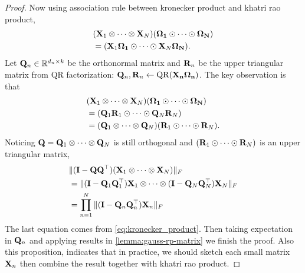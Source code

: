 \begin{proof}
Now using association rule between kronecker product and khatri rao product,   
\begin{equation}
\begin{aligned}
& (\mathbf{X}_1\otimes \cdots \otimes \mathbf{X}_N)(\mathbf{\Omega_1} \odot \cdots \odot \mathbf{\Omega_N})  \\
& = ( \mathbf{X}_1\mathbf{\Omega_1}\odot \cdots \odot  \mathbf{X}_N\mathbf{\Omega_N}). 
\end{aligned}
\end{equation}
 Let $\mathbf{Q}_n\in \mathbb{R}^{d_n\times k}$ be the orthonormal matrix and $\mathbf{R}_n$ be the upper triangular matrix from QR factorization: $\mathbf{Q}_n, \mathbf{R}_n \gets  \rm{QR}(\mathbf{X_n\Omega_n})$. The key observation is that 
\begin{equation}
\begin{aligned}
& (\mathbf{X}_1\otimes \cdots \otimes \mathbf{X}_N)(\mathbf{\Omega_1} \odot \cdots \odot \mathbf{\Omega_N})  \\
& = ( \mathbf{Q}_1\mathbf{R}_1 \odot \cdots \odot  \mathbf{Q}_N\mathbf{R}_N)\\
& = (\mathbf{Q}_1 \otimes \cdots \otimes \mathbf{Q}_N) (\mathbf{R}_1\odot \cdots \odot \mathbf{R}_N).
\end{aligned}
\end{equation}
Noticing $\mathbf{Q} = \mathbf{Q}_1\otimes \cdots \otimes \mathbf{Q}_N$ is still orthogonal and $(\mathbf{R}_1\odot \cdots \odot \mathbf{R}_N)$ 
is an upper triangular matrix,  
\begin{equation}
\begin{aligned}
& \|(\mathbf{I} - \mathbf{QQ}^\top)  (\mathbf{X}_1\otimes \cdots \otimes \mathbf{X}_N)\|_F \\
& = \|(\mathbf{I} - \mathbf{Q}_1\mathbf{Q}_1^\top) \mathbf{X}_1 \otimes \cdots \otimes (\mathbf{I} - \mathbf{Q}_N\mathbf{Q}_N^\top) \mathbf{X}_N  \|_F\\
& =\prod_{n=1}^N \|(\mathbf{I} - \mathbf{Q}_n\mathbf{Q}_n^\top) \mathbf{X}_n\|_F
\end{aligned}
\end{equation}
The last equation comes from \eqref{eq:kronecker_product}.
Then taking expectation in $\mathbf{Q}_n$ and applying results in \ref{lemma:gauss-rp-matrix} we finish the proof.  Also this proposition, indicates that in practice, we should sketch each small matrix $\mathbf{X}_n$  then combine the result together with khatri rao product. 
\end{proof}






